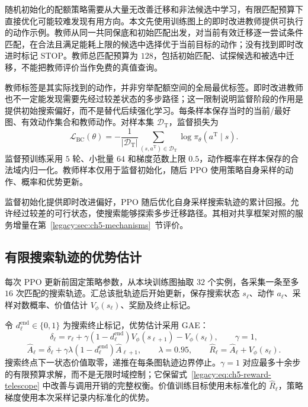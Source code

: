 随机初始化的配额策略需要从大量无改善迁移和非法候选中学习，有限匹配预算下直接优化可能较难发现有用方向。本文先使用训练图上的即时改进教师提供可执行的动作示例。教师从同一共同保底和初始匹配出发，对当前有效迁移逐一尝试条件匹配，在合法且满足能耗上限的候选中选择优于当前目标的动作；没有找到即时改进时标记 STOP。教师总匹配预算为 $128$，包括初始匹配、试探候选和被选中迁移，不能把教师评价当作免费的真值查询。

教师标签是其实际找到的动作，并非穷举配额空间的全局最优标签。即时改进教师也不一定能发现需要先经过较差状态的多步路径；这一限制说明监督阶段的作用是提供初始搜索偏好，而不是替代后续强化学习。每条样本保存当时的当前/最好图、有效动作集合和教师动作。对样本集 $\mathcal D_{\mathrm T}$，监督损失为
\begin{equation}
 \mathcal L_{\mathrm{BC}}(\theta)=
 -\frac{1}{|\mathcal D_{\mathrm T}|}
 \sum_{(s,a^{\mathrm T})\in\mathcal D_{\mathrm T}}
 \log\pi_\theta(a^{\mathrm T}\mid s).
 \label{legacy:eq:ch5-bc-loss}
\end{equation}
监督预训练采用 $5$ 轮、小批量 $64$ 和梯度范数上限 $0.5$，动作概率在样本保存的合法域内归一化。教师样本仅用于监督初始化，随后 PPO 使用策略自身采样的动作、概率和优势更新。

监督初始化提供即时改进偏好，PPO 随后优化自身采样搜索轨迹的累计回报。允许经过较差的可行状态，使搜索能够探索多步迁移路径。其相对共享框架对照的服务增量在第~\ref{legacy:sec:ch5-mechanisms}~节评价。

\subsection{有限搜索轨迹的优势估计}

每次 PPO 更新前固定策略参数，从本块训练图抽取 $32$ 个实例，各采集一条至多 $16$ 次匹配的搜索轨迹。汇总该批轨迹后开始更新，保存搜索状态 $s_\ell$、动作 $a_\ell$、采样对数概率、价值估计 $V_\phi(s_\ell)$、奖励及终止标记。

令 $d_\ell^{\mathrm{end}}\in\{0,1\}$ 为搜索终止标记，优势估计采用 GAE\cite{schulman2015high}：
\begin{equation}
 \delta_\ell=r_\ell+\gamma(1-d_\ell^{\mathrm{end}})V_\phi(s_{\ell+1})-V_\phi(s_\ell),
 \qquad \gamma=1,
 \label{legacy:eq:ch5-search-td}
\end{equation}
\begin{equation}
 \widehat A_\ell=\delta_\ell+\gamma\lambda(1-d_\ell^{\mathrm{end}})\widehat A_{\ell+1},
 \qquad\lambda=0.95,\qquad
 \widehat R_\ell=\widehat A_\ell+V_\phi(s_\ell).
 \label{legacy:eq:ch5-search-gae}
\end{equation}
搜索终点下一状态价值取零，递推在每条图轨迹边界停止。$\gamma=1$ 对应最多十余步的有限预算求解，而不是无限时域控制；它保留式~\eqref{legacy:eq:ch5-reward-telescope} 中改善与调用开销的完整权衡。价值训练目标使用未标准化的 $\widehat R_\ell$，策略梯度使用本次采样记录内标准化的优势。

